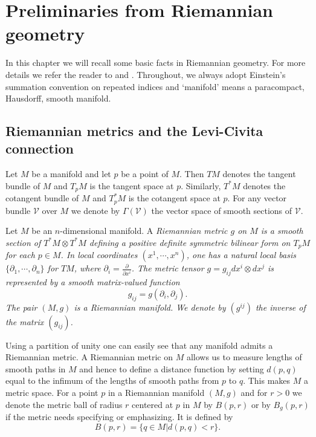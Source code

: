 \chapter{Preliminaries from Riemannian geometry}
\label{chap:prelim}
\label{sectprelim}

In this chapter we will recall some basic facts in Riemannian
geometry. For more details we refer the reader to \cite{doCarmo} and
\cite{Petersen}. Throughout, we always adopt Einstein's summation
convention on repeated indices and `manifold' means a paracompact,
Hausdorff, smooth manifold.


\section{Riemannian metrics and the Levi-Civita connection}

Let $M$ be a manifold and let $p$ be a point of $M$. Then $TM$
denotes the tangent bundle of $M$ and $T_pM$ is the tangent space at
$p$. Similarly, $T^*M$ denotes the cotangent bundle of $M$ and
$T^*_pM$ is the cotangent space at $p$. For any vector bundle
${\mathcal V}$ over $M$ we denote by $\Gamma({\mathcal V})$ the
vector space of smooth sections of ${\mathcal V}$.

\begin{definition}
\label{def:riemannian-metric}
\leanok
Let $M$ be an $n$-dimensional manifold. A \it Riemannian metric \rm
$g$ on $M$ is a smooth section of $T^*M\otimes T^*M$ defining a
positive definite symmetric bilinear form on $T_pM$ for each $p\in
M$. In local coordinates $(x^1,\cdots, x^n)$, one has a natural
local basis $\{\partial_1,\cdots,\partial_n\}$ for $TM$, where
$\partial_i=\frac{\partial}{\partial x^i}$. The metric tensor
$g=g_{ij} dx^i\otimes dx^j$ is represented by a smooth matrix-valued
function
\[ g_{ij}=g(\partial_i,\partial_j). \]
 The
pair $(M,g)$ is a {\sl Riemannian manifold}. We denote by $(g^{ij})$
the inverse of the matrix $(g_{ij})$.
\end{definition}

Using a partition of unity one can easily see that any manifold
admits a Riemannian metric. A Riemannian metric on $M$ allows us to
measure lengths of smooth paths in $M$ and hence to define a
distance function by setting $d(p,q)$ equal to the infimum of the
lengths of smooth paths from $p$ to $q$. This makes $M$ a metric
space. For a point $p$ in a Riemannian manifold $(M,g)$ and for $r>
0$ we denote the metric ball of radius $r$ centered at $p$ in $M$ by
$B(p,r)$ or by $B_g(p,r)$ if the metric needs specifying or
emphasizing. It is defined by
$$B(p,r)=\{q\in M\left|\right. d(p,q)<r\}.$$

